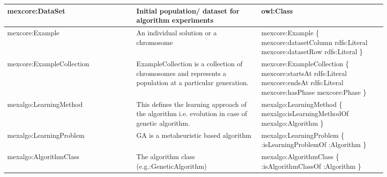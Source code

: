 \documentclass[preprint,12pt]{elsarticle}
\begin{document}
{\begin{longtable}[!h]{ | p{0.31\linewidth} | p{0.3\linewidth}| p{0.3\linewidth} |}

mexcore:DataSet & Initial population/ dataset for algorithm experiments & {\scriptsize owl:Class} \\
\hline

mexcore:Example & An individual solution or a chromosome & {\scriptsize   mexcore:Example \{ \newline mexcore:datasetColumn rdfs:Literal \newline mexcore:datasetRow rdfs:Literal \newline   \}      }\\
\hline

mexcore:ExampleCollection & ExampleCollection is a collection of chromosomes and represents a population at a particular generation. & {\scriptsize  mexcore:ExampleCollection  \{  \newline mexcore:startsAt rdfs:Literal \newline mexcore:endsAt rdfs:Literal \newline mexcore:hasPhase mexcore:Phase \newline   \}      }\\
\hline


mexalgo:LearningMethod & 
This defines the learning approach of the algorithm i.e. evolution in case of genetic algorithm. & {\scriptsize  mexalgo:LearningMethod \{ \newline mexalgo:isLearningMethodOf mexalgo:Algorithm \newline \}      }\\
\hline

mexalgo:LearningProblem & GA is a metaheuristic based algorithm & {\scriptsize  mexalgo:LearningProblem  \{ \newline :isLearningProblemOf :Algorithm \newline    \}      }\\
\hline

mexalgo:AlgorithmClass & The algorithm class (e.g.:GeneticAlgorithm) & {\scriptsize  mexalgo:AlgorithmClass  \{ \newline :isAlgorithmClassOf :Algorithm \newline    \}      }\\
\hline


\end{longtable}}
\end{document}
